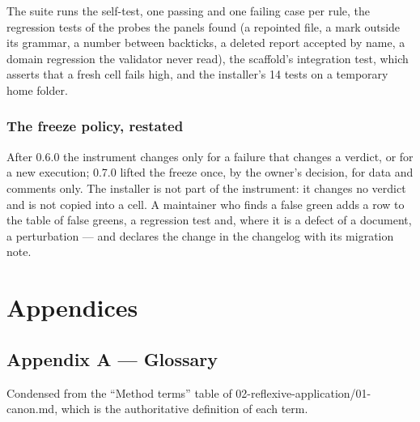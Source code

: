 \documentclass[
  american,
  10pt,
]{report}
\renewcommand{\texttt}[1]{{\ttfamily\hyphenchar\font=-1 #1}}
\begin{document}
The suite runs the self-test, one passing and one failing case per rule,
the regression tests of the probes the panels found (a repointed file, a
mark outside its grammar, a number between backticks, a deleted report
accepted by name, a domain regression the validator never read), the
scaffold's integration test, which asserts that a fresh cell fails high,
and the installer's 14 tests on a temporary home folder.

\section{The freeze policy, restated}\label{the-freeze-policy-restated}

After 0.6.0 the instrument changes only for a failure that changes a
verdict, or for a new execution; 0.7.0 lifted the freeze once, by the
owner's decision, for data and comments only. The installer is not part
of the instrument: it changes no verdict and is not copied into a cell.
A maintainer who finds a false green adds a row to the table of false
greens, a regression test and, where it is a defect of a document, a
perturbation --- and declares the change in the changelog with its
migration note.

\part{Appendices}

\chapter*{Appendix A --- Glossary}\label{appendix-a-glossary}

Condensed from the ``Method terms'' table of
\texttt{02-\allowbreak{}reflexive-\allowbreak{}application/\allowbreak{}01-\allowbreak{}canon.\allowbreak{}md},
which is the authoritative definition of each term.
\end{document}
